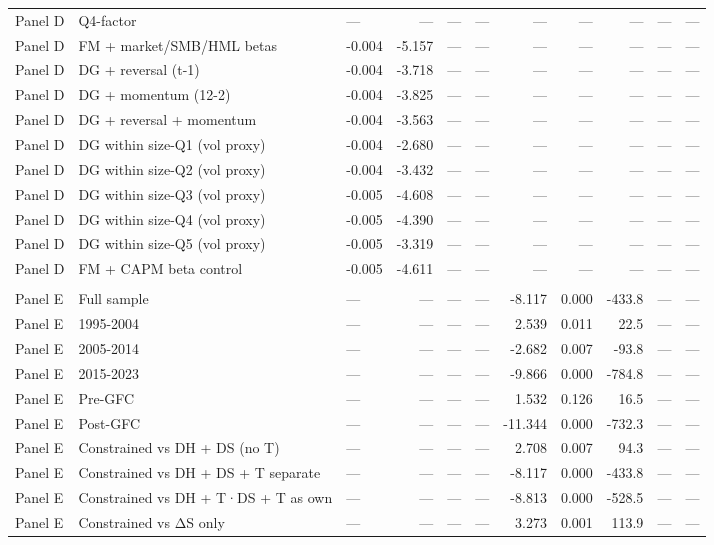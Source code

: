 \begin{longtable}{lllrrrrrrrl}
Panel D & Q4-factor & — & — & — & — & — & — & — & — & — \\
Panel D & FM + market/SMB/HML betas & -0.004 & -5.157 & — & — & — & — & — & — & — \\
Panel D & DG + reversal (t-1) & -0.004 & -3.718 & — & — & — & — & — & — & — \\
Panel D & DG + momentum (12-2) & -0.004 & -3.825 & — & — & — & — & — & — & — \\
Panel D & DG + reversal + momentum & -0.004 & -3.563 & — & — & — & — & — & — & — \\
Panel D & DG within size-Q1 (vol proxy) & -0.004 & -2.680 & — & — & — & — & — & — & — \\
Panel D & DG within size-Q2 (vol proxy) & -0.004 & -3.432 & — & — & — & — & — & — & — \\
Panel D & DG within size-Q3 (vol proxy) & -0.005 & -4.608 & — & — & — & — & — & — & — \\
Panel D & DG within size-Q4 (vol proxy) & -0.005 & -4.390 & — & — & — & — & — & — & — \\
Panel D & DG within size-Q5 (vol proxy) & -0.005 & -3.319 & — & — & — & — & — & — & — \\
Panel D & FM + CAPM beta control & -0.005 & -4.611 & — & — & — & — & — & — & — \\
\addlinespace
\multicolumn{11}{l}{\textit{Panel E: Vuong Test Stress Tests}} \\
Panel E & Full sample & — & — & — & — & -8.117 & 0.000 & -433.8 & — & — \\
Panel E & 1995-2004 & — & — & — & — & 2.539 & 0.011 & 22.5 & — & — \\
Panel E & 2005-2014 & — & — & — & — & -2.682 & 0.007 & -93.8 & — & — \\
Panel E & 2015-2023 & — & — & — & — & -9.866 & 0.000 & -784.8 & — & — \\
Panel E & Pre-GFC & — & — & — & — & 1.532 & 0.126 & 16.5 & — & — \\
Panel E & Post-GFC & — & — & — & — & -11.344 & 0.000 & -732.3 & — & — \\
Panel E & Constrained vs DH + DS (no T) & — & — & — & — & 2.708 & 0.007 & 94.3 & — & — \\
Panel E & Constrained vs DH + DS + T separate & — & — & — & — & -8.117 & 0.000 & -433.8 & — & — \\
Panel E & Constrained vs DH + T·DS + T as own & — & — & — & — & -8.813 & 0.000 & -528.5 & — & — \\
Panel E & Constrained vs ΔS only & — & — & — & — & 3.273 & 0.001 & 113.9 & — & — \\

\end{longtable}
